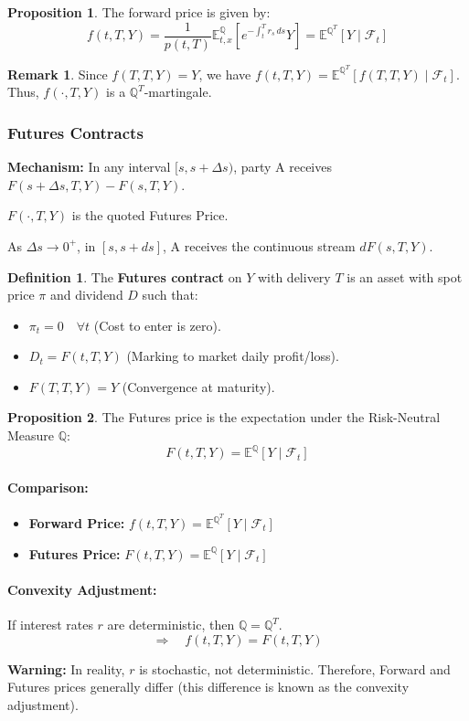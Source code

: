 \documentclass[12pt,a4paper]{article}
\theoremstyle{definition}
\newtheorem{definition}{Definition}[section]
\newtheorem{proposition}{Proposition}[section]
\newtheorem{remark}{Remark}[section]
\newcommand{\Q}{\mathbb{Q}}
\newcommand{\E}{\mathbb{E}}
\begin{document}
\begin{proposition}
The forward price is given by:
\[
f(t, T, Y) = \frac{1}{p(t,T)}\E_{t,x}^{\Q}\left[e^{-\int_t^T r_s \, ds} Y\right] = \E^{\Q^T}[Y \mid \mathcal{F}_t]
\]
\end{proposition}

\begin{remark}
Since $f(T, T, Y) = Y$, we have $f(t, T, Y) = \E^{\Q^T}[f(T, T, Y) \mid \mathcal{F}_t]$. Thus, $f(\cdot, T, Y)$ is a $\Q^T$-martingale.
\end{remark}

\subsubsection{Futures Contracts}

\textbf{Mechanism:} In any interval $[s, s + \Delta s)$, party A receives $F(s + \Delta s, T, Y) - F(s, T, Y)$.

$F(\cdot, T, Y)$ is the quoted Futures Price.

As $\Delta s \to 0^+$, in $[s, s + ds]$, A receives the continuous stream $dF(s, T, Y)$.

\begin{definition}
The \textbf{Futures contract} on $Y$ with delivery $T$ is an asset with spot price $\pi$ and dividend $D$ such that:
\begin{itemize}
\item $\pi_t = 0 \quad \forall t$ (Cost to enter is zero).
\item $D_t = F(t, T, Y)$ (Marking to market daily profit/loss).
\item $F(T, T, Y) = Y$ (Convergence at maturity).
\end{itemize}
\end{definition}

\begin{proposition}
The Futures price is the expectation under the Risk-Neutral Measure $\Q$:
\[
F(t, T, Y) = \E^{\Q}[Y \mid \mathcal{F}_t]
\]
\end{proposition}

\paragraph{Comparison:}
\begin{itemize}
\item \textbf{Forward Price:} $f(t, T, Y) = \E^{\Q^T}[Y \mid \mathcal{F}_t]$
\item \textbf{Futures Price:} $F(t, T, Y) = \E^{\Q}[Y \mid \mathcal{F}_t]$
\end{itemize}

\paragraph{Convexity Adjustment:} 

If interest rates $r$ are deterministic, then $\Q = \Q^T$.
\[
\Longrightarrow \quad f(t, T, Y) = F(t, T, Y)
\]

\textbf{Warning:} In reality, $r$ is stochastic, not deterministic. Therefore, Forward and Futures prices generally differ (this difference is known as the convexity adjustment).
\end{document}
